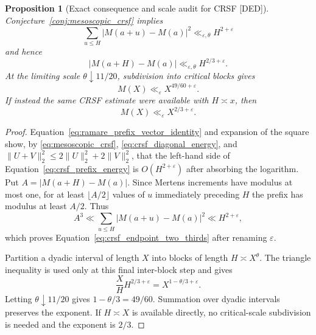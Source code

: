 \documentclass[11pt]{amsart}
\numberwithin{equation}{section}
\theoremstyle{plain}
\newtheorem{proposition}[theorem]{Proposition}
\theoremstyle{definition}
\theoremstyle{remark}
\newcommand{\Mert}{M}
\newcommand{\eps}{\varepsilon}
\begin{document}
\begin{proposition}[Exact consequence and scale audit for CRSF
\textnormal{[DED]}]
\label{prop:crsf_consequences}
Conjecture~\ref{conj:mesoscopic_crsf} implies
\begin{equation}
 \sum_{u\leq H}|\Mert(a+u)-\Mert(a)|^2
 \ll_{\eps,\theta}H^{2+\eps}
\label{eq:crsf_prefix_energy}
\end{equation}
and hence
\begin{equation}
 |\Mert(a+H)-\Mert(a)|\ll_{\eps,\theta}H^{2/3+\eps}.
\label{eq:crsf_endpoint_two_thirds}
\end{equation}
At the limiting scale $\theta\downarrow11/20$, subdivision into critical
blocks gives
\begin{equation}
 \Mert(X)\ll_\eps X^{49/60+\eps}.
\label{eq:crsf_global_49_60}
\end{equation}
If instead the same CRSF estimate were available with $H\asymp x$, then
\begin{equation}
 \Mert(X)\ll_\eps X^{2/3+\eps}.
\label{eq:crsf_global_two_thirds}
\end{equation}
\end{proposition}

\begin{proof}
Equation~\eqref{eq:ramare_prefix_vector_identity} and expansion of the square
show, by \eqref{eq:mesoscopic_crsf}, \eqref{eq:crsf_diagonal_energy}, and
$\|U+V\|_2^2\leq2\|U\|_2^2+2\|V\|_2^2$, that the left-hand side of
Equation~\eqref{eq:crsf_prefix_energy} is $O(H^{2+\eps})$ after absorbing
the logarithm.  Put
$A=|\Mert(a+H)-\Mert(a)|$.  Since Mertens increments have modulus at most
one, for at least $\lfloor A/2\rfloor$ values of $u$ immediately preceding
$H$ the prefix has modulus at least $A/2$.  Thus
\begin{equation}
 A^3\ll\sum_{u\leq H}|\Mert(a+u)-\Mert(a)|^2
 \ll H^{2+\eps},
\end{equation}
which proves Equation~\eqref{eq:crsf_endpoint_two_thirds} after renaming
$\eps$.

Partition a dyadic interval of length $X$ into blocks of length
$H\asymp X^\theta$.  The triangle inequality is used only at this final
inter-block step and gives
\begin{equation}
 \frac{X}{H}H^{2/3+\eps}
 =X^{1-\theta/3+\eps}.
\end{equation}
Letting $\theta\downarrow11/20$ gives $1-\theta/3=49/60$.
Summation over dyadic intervals preserves the exponent.  If $H\asymp X$ is
available directly, no critical-scale subdivision is needed and the exponent
is $2/3$.
\end{proof}
\end{document}
